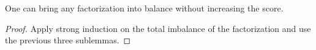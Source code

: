 \begin{lemma}
\label{score-lowest}
\leanok
One can bring any factorization into balance without increasing the score.
\end{lemma}
\begin{proof}
\leanok
Apply strong induction on the total imbalance of the factorization and use the
  previous three sublemmas.
\end{proof}
